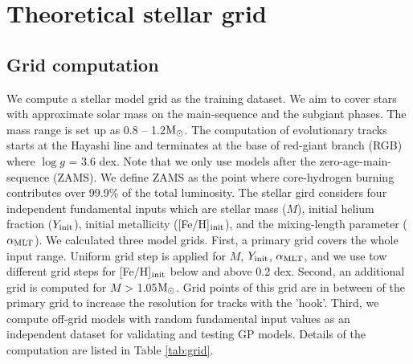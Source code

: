 \section{Theoretical stellar grid}\label{sec:grid}

\subsection{Grid computation}

We compute a stellar model grid as the training dataset. We aim to cover stars with approximate solar mass on the main-sequence and the subgiant phases. The mass range is set up as 0.8 -- 1.2$\rm M_{\odot}$. The computation of evolutionary tracks starts at the Hayashi line and terminates at the base of red-giant branch (RGB) where $\log g$ = 3.6 dex. Note that we only use models after the zero-age-main-sequence (ZAMS). We define ZAMS as the point where core-hydrogen burning contributes over 99.9\% of the total luminosity. 
%
The stellar gird considers four independent fundamental inputs which are stellar mass ($M$), initial helium fraction ($Y_{\rm init}$), initial metallicity ([Fe/H]$_{\rm init}$), and the mixing-length parameter ($\alpha_{\rm MLT}$). 
%
We calculated three model grids. First, a primary grid covers the whole input range. Uniform grid step is applied for $M$, $Y_{\rm init}$, $\alpha_{\rm MLT}$, and we use tow different grid steps for [Fe/H]$_{\rm init}$ below and above 0.2 dex.  Second, an additional grid is computed for $M$ > 1.05$\rm M_{\odot}$. Grid points of this grid are in between of the primary grid to increase the resolution for tracks with the 'hook'. 
Third, we compute off-grid models with random fundamental input values as an independent dataset for validating and testing GP models. 
%
Details of the computation are listed in Table \ref{tab:grid}. 

